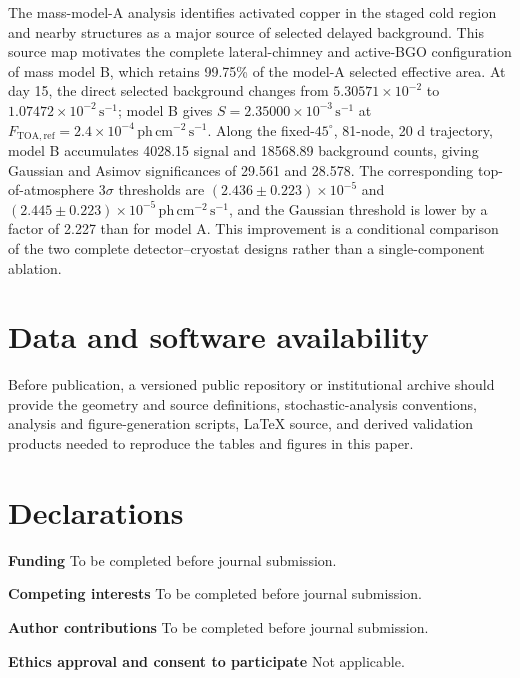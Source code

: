 \documentclass[11pt]{article}
\newcommand{\phcms}{\ensuremath{\,\mathrm{ph\,cm^{-2}\,s^{-1}}}}
\newcommand{\cps}{\ensuremath{\,\mathrm{s^{-1}}}}
\newcommand{\ftoaref}{F_{\mathrm{TOA,ref}}}
\begin{document}
The mass-model-A analysis identifies activated copper in the staged cold region
and nearby structures as a major source of selected delayed background. This
source map motivates the complete lateral-chimney and active-BGO configuration
of mass model B, which retains 99.75\% of the model-A selected effective area.
At day 15, the direct selected background changes from
$5.30571\times10^{-2}$ to $1.07472\times10^{-2}\cps$; model B gives
$S=2.35000\times10^{-3}\cps$ at $\ftoaref=2.4\times10^{-4}\phcms$. Along the
fixed-$45^\circ$, 81-node, 20 d trajectory, model B accumulates 4028.15 signal
and 18568.89 background counts, giving Gaussian and Asimov significances of
29.561 and 28.578. The corresponding top-of-atmosphere $3\sigma$ thresholds are
$(2.436\pm0.223)\times10^{-5}$ and
$(2.445\pm0.223)\times10^{-5}\phcms$, and the Gaussian threshold is lower by a
factor of 2.227 than for model A. This improvement is a conditional comparison
of the two complete detector--cryostat designs rather than a single-component
ablation.

\section*{Data and software availability}
Before publication, a versioned public repository or institutional archive should provide the geometry and source definitions, stochastic-analysis conventions, analysis and figure-generation scripts, LaTeX source, and derived validation products needed to reproduce the tables and figures in this paper.

\section*{Declarations}
\textbf{Funding} To be completed before journal submission.

\textbf{Competing interests} To be completed before journal submission.

\textbf{Author contributions} To be completed before journal submission.

\textbf{Ethics approval and consent to participate} Not applicable.
\end{document}
